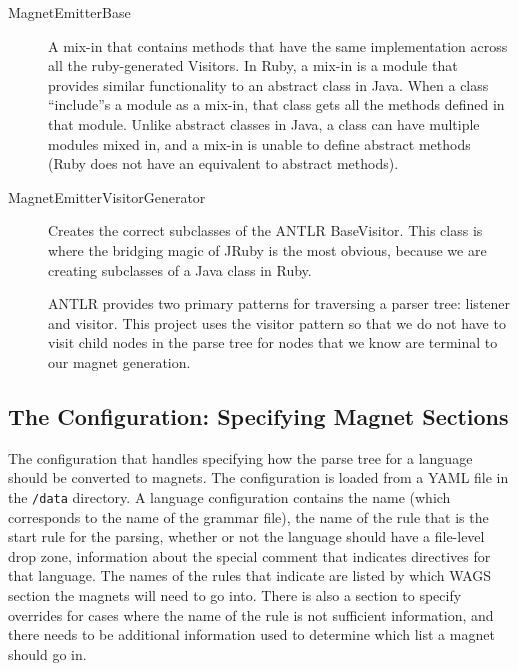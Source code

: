 \documentclass[letter,10pt,final]{article}
\begin{document}
\begin{description}
 \item [MagnetEmitterBase] A mix-in that contains methods that have the 
same implementation across all the ruby-generated Visitors. In Ruby, a 
mix-in is a module that provides similar functionality to an abstract 
class in Java. When a class ``include''s a module as a mix-in, that 
class gets all the methods defined in that module. Unlike abstract 
classes in Java, a class can have multiple modules mixed in, and a 
mix-in is unable to define abstract methods (Ruby does not have an 
equivalent to abstract methods).

\item[MagnetEmitterVisitorGenerator] Creates the correct subclasses of 
the ANTLR BaseVisitor. This class is where the bridging magic of JRuby 
is the most obvious, because we are creating subclasses of a Java class 
in Ruby.

ANTLR provides two primary patterns for traversing a parser tree: 
listener and visitor. This project uses the visitor pattern so that we 
do not have to visit child nodes in the parse tree for nodes that we 
know are terminal to our magnet generation. 

\end{description}


\subsection{The Configuration: Specifying Magnet Sections}
\label{sec:newConfig}

The configuration that handles specifying how the parse tree for a 
language should be converted to magnets. The configuration is loaded 
from a YAML file in the \verb~/data~ directory. A language 
configuration contains the name (which corresponds to the 
name of the grammar file), the name of the rule that is the start rule 
for the parsing, whether or not the language should have a file-level 
drop zone, information about the special comment that indicates 
directives for that language. The names of the rules that indicate are 
listed by which WAGS section the magnets will need to go into. There is 
also a section to specify overrides for cases where the name of the 
rule is not sufficient information, and there needs to be additional 
information used to determine which list a magnet should go in.
\end{document}
